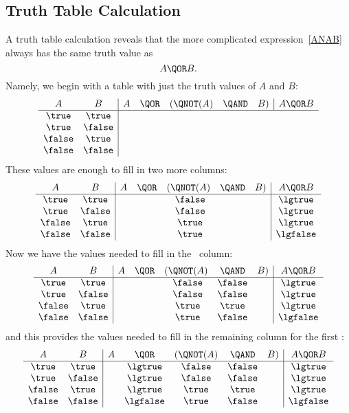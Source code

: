 \subsection{Truth Table Calculation}
A truth table calculation reveals that the more complicated
expression~\ref{ANAB} always has the same truth value as
\begin{equation}\label{AOB}
A \QOR B.
\end{equation}
Namely, we begin with a table with just the truth values of $A$ and $B$:
\[
\begin{array}{cc|ccccc|c}
A      & B      & A  & \QOR  & (\QNOT(A)& \QAND & B) & A \QOR  B \\ \hline
\true  & \true \\
\true  & \false\\
\false & \true \\
\false & \false                       
\end{array}
\]
These values are enough to fill in two more columns:
\[
\begin{array}{cc|ccccc|c}
A      & B      & A & \QOR  & (\QNOT(A) & \QAND & B) & A \QOR  B \\ \hline
\true  & \true  &   &       & \ \false   &       &    & \lgtrue \\
\true  & \false &   &       & \ \false   &       &    & \lgtrue \\
\false & \true  &   &       & \ \true    &       &    & \lgtrue \\
\false & \false &   &       & \ \true    &       &    & \lgfalse\\
\end{array}
\]
Now we have the values needed to fill in the \QAND\ column:
\[
\begin{array}{cc|ccccc|c}
A      & B      & A & \QOR  & (\QNOT(A) & \QAND   & B) & A \QOR  B \\ \hline
\true  & \true  &   &       & \ \false   &  \false &    & \lgtrue \\
\true  & \false &   &       & \ \false   &  \false &    & \lgtrue \\
\false & \true  &   &       & \ \true    &  \true  &    & \lgtrue \\
\false & \false &   &       & \ \true    &  \false &    & \lgfalse\\
\end{array}
\]
and this provides the values needed to fill in the remaining column for the first \QOR:
\[
\begin{array}{cc|ccccc|c}
A      & B      & A & \QOR     &(\QNOT(A) & \QAND   & B) & A \QOR  B \\ \hline
\true  & \true  &   & \lgtrue  & \false &    \false &    & \lgtrue \\
\true  & \false &   & \lgtrue  & \false &    \false &    & \lgtrue \\
\false & \true  &   & \lgtrue  & \true  &    \true  &    & \lgtrue \\
\false & \false &   & \lgfalse & \true  &    \false &    & \lgfalse\\
\end{array}
\]
